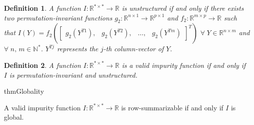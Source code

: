 \documentclass[sn-mathphys-num]{sn-jnl}%
\theoremstyle{thmstyleone}%
\theoremstyle{thmstyletwo}%
\theoremstyle{thmstylethree}%
\newtheorem{definition}{Definition}%
\begin{document}
\begin{definition}
    \label{def:unstructured}
    A function $I\colon \mathbb{R}^{*\times *}\to \mathbb{R}$ is \emph{unstructured} if and only if there exists two permutation-invariant functions $g_2\colon \mathbb{R}^{n\times 1}\to\mathbb{R}^{p\times 1}$ and $f_2\colon \mathbb{R}^{m\times p} \to \mathbb{R}$
    such that
    $I(Y) = f_2(
    \begin{bmatrix}
         g_2(Y^{T1}), & g_2(Y^{T2}), & \dots, & g_2(Y^{Tm})
    \end{bmatrix}^T)$
    $\forall\;Y \in \mathbb{R}^{n\times m}$ and $\forall\;n,\,m \in \mathbb{N}^*$. $Y^{Tj}$ represents the $j$-th column-vector of $Y$.
\end{definition}
\begin{definition}
    \label{def:valid}
    A function $I\colon \mathbb{R}^{*\times *}\to \mathbb{R}$ is a \emph{valid impurity function} if and only if $I$ is permutation-invariant and unstructured.
\end{definition}
%
\medskip

%
\begin{restatable}{thm}{Globality}
\label{the:bgso text}
%


A valid impurity function $I\colon\mathbb{R}^{*\times *}\to \mathbb{R}$ is row-summarizable if and only if $I$ is global.

\end{restatable}

\medskip
\end{document}

